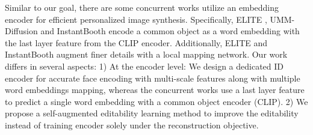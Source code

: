 Similar to our goal, there are some concurrent works utilize an embedding encoder for efficient personalized image synthesis. Specifically, ELITE \cite{wei2023elite}, UMM-Diffusion \cite{ma2023unified} and InstantBooth \cite{shi2023instantbooth} encode a common object as a word embedding with the last layer feature from the CLIP encoder. Additionally, ELITE and InstantBooth augment finer details with a local mapping network. Our work differs in several aspects:  1) At the encoder level:  We design a dedicated ID encoder for accurate face encoding with multi-scale features along with multiple word embeddings mapping, whereas the concurrent works use a last layer feature to predict a single word embedding with a common object encoder (CLIP). 2) We propose a self-augmented editability learning method to improve the editability instead of training encoder solely under the reconstruction objective.
